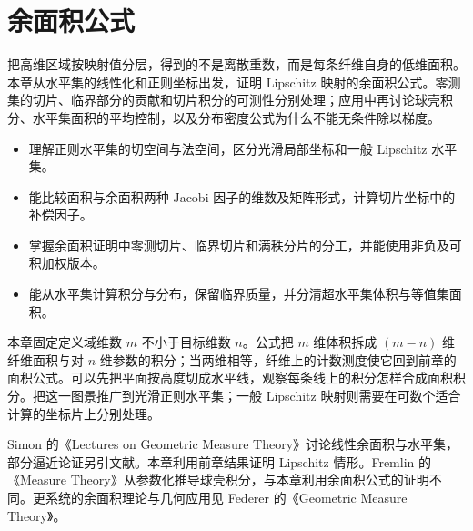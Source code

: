 \chapter{余面积公式}
\label{b1:ch:18}
\begin{chapterabstract}
把高维区域按映射值分层，得到的不是离散重数，而是每条纤维自身的低维面积。本章从水平集的线性化和正则坐标出发，证明 Lipschitz 映射的余面积公式。零测集的切片、临界部分的贡献和切片积分的可测性分别处理；应用中再讨论球壳积分、水平集面积的平均控制，以及分布密度公式为什么不能无条件除以梯度。
\end{chapterabstract}

\begin{learninggoals}
\begin{itemize}
\item\label{b1:item:ch18-goal-level}理解正则水平集的切空间与法空间，区分光滑局部坐标和一般 Lipschitz 水平集。
\item\label{b1:item:ch18-goal-jacobian}能比较面积与余面积两种 Jacobi 因子的维数及矩阵形式，计算切片坐标中的补偿因子。
\item\label{b1:item:ch18-goal-proof}掌握余面积证明中零测切片、临界切片和满秩分片的分工，并能使用非负及可积加权版本。
\item\label{b1:item:ch18-goal-density}能从水平集计算积分与分布，保留临界质量，并分清超水平集体积与等值集面积。
\end{itemize}
\end{learninggoals}

本章固定定义域维数 \(m\) 不小于目标维数 \(n\)。公式把 \(m\) 维体积拆成 \((m-n)\) 维纤维面积与对 \(n\) 维参数的积分；当两维相等，纤维上的计数测度使它回到前章的面积公式。可以先把平面按高度切成水平线，观察每条线上的积分怎样合成面积积分。把这一图景推广到光滑正则水平集；一般 Lipschitz 映射则需要在可数个适合计算的坐标片上分别处理。

\ProseParagraphBreak

Simon 的《Lectures on Geometric Measure Theory》\cite[\S10]{Simon1983Lectures}讨论线性余面积与水平集，部分逼近论证另引文献。本章利用前章结果证明 Lipschitz 情形。Fremlin 的《Measure Theory》\cite[265G]{Fremlin2016Measure}从参数化推导球壳积分，与本章利用余面积公式的证明不同。更系统的余面积理论与几何应用见 Federer 的《Geometric Measure Theory》\cite{Federer1996Geometric}。

